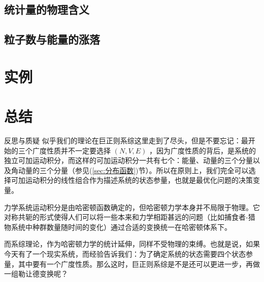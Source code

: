 \subsection{统计量的物理含义}\label{sec:统计量的物理含义}

\subsection{粒子数与能量的涨落}\label{sec:粒子数与能量的涨落}

\section{实例}\label{sec:巨正则实例}

\section{总结}\label{sec:巨正则总结}

\begin{justification}{\kaishu 反思与质疑}
\kaishu \fontsize{11pt}{16pt}
    \quad\quad 似乎我们的理论在巨正则系综这里走到了尽头，但是不要忘记：最开始的三个广度性质并不一定要选择 $(N,V,E)$ ，因为广度性质的背后，是系统的独立可加运动积分，而这样的可加运动积分一共有七个：能量、动量的三个分量以及角动量的三个分量（参见(\ref*{sec:分布函数})节）。所以在原则上，我们完全可以选择可加运动积分的线性组合作为描述系统的状态参量，也就是最优化问题的决策变量。

    \quad\quad 力学系统运动积分是由哈密顿函数确定的，但哈密顿力学本身并不局限于物理。它对称共轭的形式使得人们可以将一些本来和力学相距甚远的问题（比如捕食者-猎物系统中种群数量随时间的变化）通过合适的变换统一在哈密顿体系下。
    
    \quad\quad 而系综理论，作为哈密顿力学的统计延伸，同样不受物理的束缚。也就是说，如果今天有了一个现实系统，而经验告诉我们：为了确定系统的状态需要四个状态参量，其中要有一个广度性质。那么这时，巨正则系综是不是还可以更进一步，再做一组勒让德变换呢？
\end{justification}